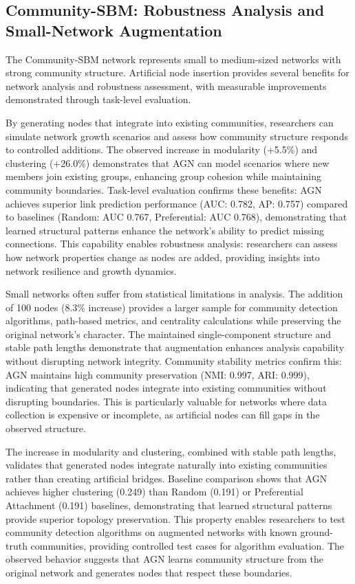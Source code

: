 \documentclass[12pt]{article}
\begin{document}
\subsection{Community-SBM: Robustness Analysis and Small-Network Augmentation}

The Community-SBM network represents small to medium-sized networks with strong community structure. Artificial node insertion provides several benefits for network analysis and robustness assessment, with measurable improvements demonstrated through task-level evaluation.

By generating nodes that integrate into existing communities, researchers can simulate network growth scenarios and assess how community structure responds to controlled additions. The observed increase in modularity (+5.5\%) and clustering (+26.0\%) demonstrates that AGN can model scenarios where new members join existing groups, enhancing group cohesion while maintaining community boundaries. Task-level evaluation confirms these benefits: AGN achieves superior link prediction performance (AUC: 0.782, AP: 0.757) compared to baselines (Random: AUC 0.767, Preferential: AUC 0.768), demonstrating that learned structural patterns enhance the network's ability to predict missing connections. This capability enables robustness analysis: researchers can assess how network properties change as nodes are added, providing insights into network resilience and growth dynamics.

Small networks often suffer from statistical limitations in analysis. The addition of 100 nodes (8.3\% increase) provides a larger sample for community detection algorithms, path-based metrics, and centrality calculations while preserving the original network's character. The maintained single-component structure and stable path lengths demonstrate that augmentation enhances analysis capability without disrupting network integrity. Community stability metrics confirm this: AGN maintains high community preservation (NMI: 0.997, ARI: 0.999), indicating that generated nodes integrate into existing communities without disrupting boundaries. This is particularly valuable for networks where data collection is expensive or incomplete, as artificial nodes can fill gaps in the observed structure.

The increase in modularity and clustering, combined with stable path lengths, validates that generated nodes integrate naturally into existing communities rather than creating artificial bridges. Baseline comparison shows that AGN achieves higher clustering (0.249) than Random (0.191) or Preferential Attachment (0.191) baselines, demonstrating that learned structural patterns provide superior topology preservation. This property enables researchers to test community detection algorithms on augmented networks with known ground-truth communities, providing controlled test cases for algorithm evaluation. The observed behavior suggests that AGN learns community structure from the original network and generates nodes that respect these boundaries.
\end{document}
